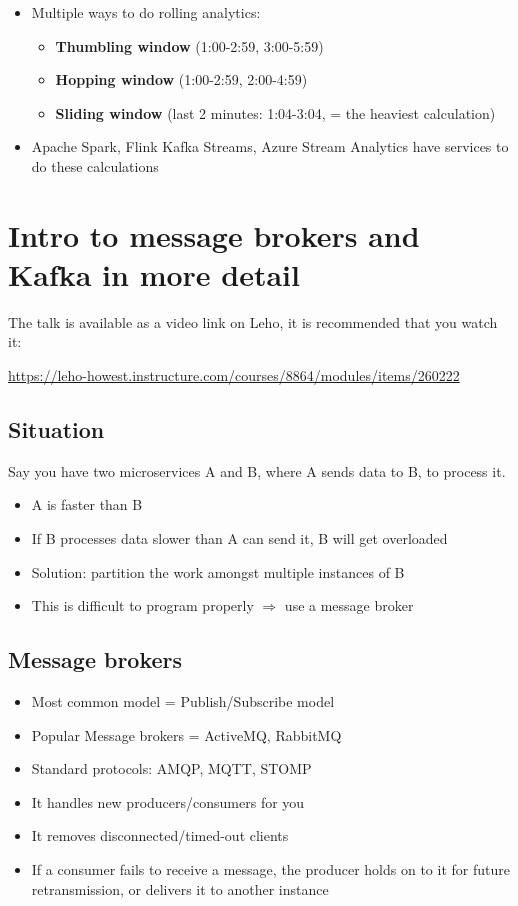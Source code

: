 \documentclass{article}
\begin{document}
\begin{itemize}
    \item Multiple ways to do rolling analytics:
    \begin{itemize}
        \item \textbf{Thumbling window} (1:00-2:59, 3:00-5:59)
        \item \textbf{Hopping window} (1:00-2:59, 2:00-4:59)
        \item \textbf{Sliding window} (last 2 minutes: 1:04-3:04, = the heaviest calculation)
    \end{itemize}
    \item Apache Spark, Flink Kafka Streams, Azure Stream Analytics have services to do these calculations
\end{itemize}

\section{Intro to message brokers and Kafka in more detail}

The talk is available as a video link on Leho, it is recommended that you watch it:

\url{https://leho-howest.instructure.com/courses/8864/modules/items/260222}

\subsection{Situation}

Say you have two microservices A and B, where A sends data to B, to process it.

\begin{itemize}
    \item A is faster than B
    \item If B processes data slower than A can send it, B will get overloaded
    \item Solution: partition the work amongst multiple instances of B
    \item This is difficult to program properly $\Rightarrow$ use a message broker 
\end{itemize}

\subsection{Message brokers}

\begin{itemize}
    \item Most common model = Publish/Subscribe model
    \item Popular Message brokers = ActiveMQ, RabbitMQ
    \item Standard protocols: AMQP, MQTT, STOMP
    \item It handles new producers/consumers for you
    \item It removes disconnected/timed-out clients
    \item If a consumer fails to receive a message, the producer holds on to it for future retransmission, or delivers it to another instance
\end{itemize}
\end{document}
